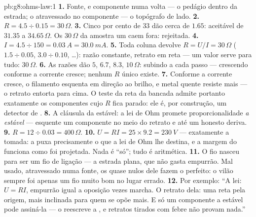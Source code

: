 \begin{solution}{pb:g8:ohms-law:1}
\textbf{1.} Fonte,  e componente numa volta  ---
o pedágio dentro da estrada; o  atravessado no componente
--- o topógrafo de lado.
\textbf{2.} $R = 4.5 \div 0.15 = 30\,\Omega$.
\textbf{3.} Cinco por cento de $33$ dão cerca de $1.65$: aceitável de
$31.35$ a $34.65\,\Omega$. Os $30\,\Omega$ da amostra um caem fora:
rejeitada.
\textbf{4.} $I = 4.5 \div 150 = \qty{0.03}{A} = \qty{30.0}{mA}$.
\textbf{5.} Toda coluna devolve $R = U/I = 30\,\Omega$
($1.5 \div 0.05$, $3.0 \div 0.10$, \dots): razão constante, retrato
em reta --- um valor serve para tudo: $30\,\Omega$.
\textbf{6.} As razões dão $5$, $6.7$, $8.3$, $10\,\Omega$: subindo a
cada passo ---  crescendo conforme a corrente cresce;
nenhum $R$ único existe.
\textbf{7.} Conforme a corrente cresce, o filamento esquenta em
direção ao brilho, e metal quente resiste mais --- o retrato entorta
para cima. O teste da reta da bancada admite portanto exatamente os
componentes cujo $R$ fica parado: ele é, por construção, um detector
de .
\textbf{8.} A cláusula da  estável: a lei de Ohm promete
proporcionalidade \emph{a  estável} --- esquente um
componente no meio do retrato e até um  honesto deriva.
\textbf{9.} $R = 12 \div 0.03 = 400\,\Omega$.
\textbf{10.} $U = R I = 25 \times 9.2 = \qty{230}{V}$ --- exatamente
a tomada: a  puxa precisamente o que a lei de Ohm lhe
destina, e a margem do  funciona como foi projetada. Nada é
``só''; tudo é aritmética.
\textbf{11.} O fio nasceu para ser um fio de ligação --- a estrada
plana, que não gasta empurrão. Mal usado, atravessado numa fonte, os
 quase nulos dele fazem o  perfeito: o vilão sempre
foi apenas um fio muito bom no lugar errado.
\textbf{12.} Por exemplo: ``A lei: $U = R I$, empurrão igual a
oposição vezes marcha. O retrato dela: uma reta pela origem, mais
inclinada para quem se opõe mais. E só um componente a 
estável pode assiná-la --- o  reescreve a , e
retratos tirados com febre não provam nada.''
\end{solution}
